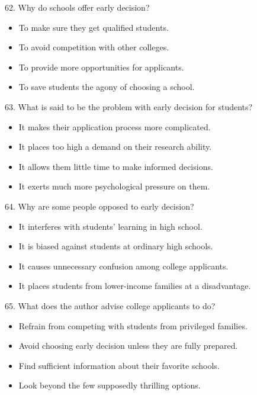 \documentclass[UTF8,11pt]{ctexart}
\begin{document}
62. Why do schools offer early decision?


\begin{itemize}[leftmargin=2em,itemsep=.2em,topsep=.4em]\item[A.] To make sure they get qualified students.
\item[B.] To avoid competition with other colleges.
\item[C.] To provide more opportunities for applicants.
\item[D.] To save students the agony of choosing a school.
\end{itemize}

63. What is said to be the problem with early decision for students?


\begin{itemize}[leftmargin=2em,itemsep=.2em,topsep=.4em]\item[A.] It makes their application process more complicated.
\item[B.] It places too high a demand on their research ability.
\item[C.] It allows them little time to make informed decisions.
\item[D.] It exerts much more psychological pressure on them.
\end{itemize}

64. Why are some people opposed to early decision?


\begin{itemize}[leftmargin=2em,itemsep=.2em,topsep=.4em]\item[A.] It interferes with students’ learning in high school.
\item[B.] It is biased against students at ordinary high schools.
\item[C.] It causes unnecessary confusion among college applicants.
\item[D.] It places students from lower-income families at a disadvantage.
\end{itemize}

65. What does the author advise college applicants to do?


\begin{itemize}[leftmargin=2em,itemsep=.2em,topsep=.4em]\item[A.] Refrain from competing with students from privileged families.
\item[B.] Avoid choosing early decision unless they are fully prepared.
\item[C.] Find sufficient information about their favorite schools.
\item[D.] Look beyond the few supposedly thrilling options.
\end{itemize}
\end{document}
